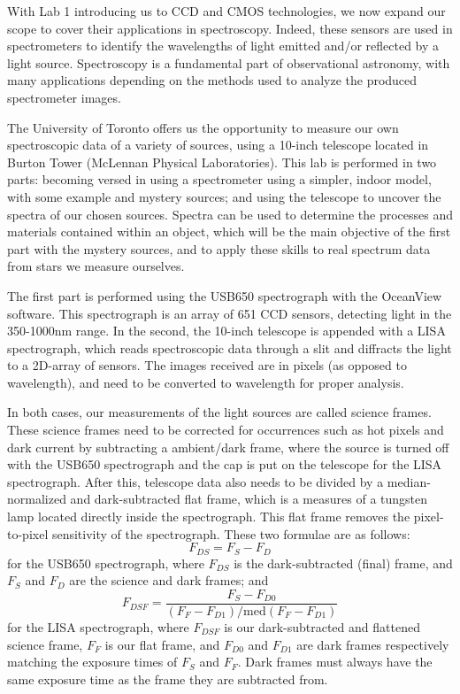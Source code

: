 \documentclass[twocolumn]{aastex702}
\begin{document}
		With Lab 1 introducing us to CCD and CMOS technologies, we now expand our scope to cover their applications in spectroscopy. Indeed, these sensors are used in spectrometers to identify the wavelengths of light emitted and/or reflected by a light source. 
		Spectroscopy is a fundamental part of observational astronomy, with many applications depending on the methods used to analyze the produced spectrometer images.
		
		The University of Toronto offers us the opportunity to measure our own spectroscopic data of a variety of sources, using a 10-inch telescope located in Burton Tower (McLennan Physical Laboratories). This lab is performed in two parts: becoming versed in using a spectrometer using a simpler, indoor model, with some example and mystery sources; and using the telescope to uncover the spectra of our chosen sources. Spectra can be used to determine the processes and materials contained within an object, which will be the main objective of the first part with the mystery sources, and to apply these skills to real spectrum data from stars we measure ourselves.
		
		The first part is performed using the USB650 spectrograph with the OceanView software. This spectrograph is an array of 651 CCD sensors, detecting light in the 350-1000nm range. In the second, the 10-inch telescope is appended with a LISA spectrograph, which reads spectroscopic data through a slit and diffracts the light to a 2D-array of sensors. The images received are in pixels (as opposed to wavelength), and need to be converted to wavelength for proper analysis.
		
		In both cases, our measurements of the light sources are called science frames. These science frames need to be corrected for occurrences such as hot pixels and dark current by subtracting a ambient/dark frame, where the source is turned off with the USB650 spectrograph and the cap is put on the telescope for the LISA spectrograph. After this, telescope data also needs to be divided by a median-normalized and dark-subtracted flat frame, which is a measures of a tungsten lamp located directly inside the spectrograph. This flat frame removes the pixel-to-pixel sensitivity of the spectrograph. These two formulae are as follows:
			\begin{equation}\label{eq:DS-USB650}
				F_{DS} = F_S - F_D
			\end{equation}
			for the USB650 spectrograph, where $F_{DS}$ is the dark-subtracted (final) frame, and $F_S$ and $F_D$ are the science and dark frames; and
			\begin{equation}
				F_{DSF} = \frac{F_S - F_{D0}}{(F_F - F_{D1}) / \text{med}(F_F - F_{D1})}
			\end{equation}
			for the LISA spectrograph, where $F_{DSF}$ is our dark-subtracted and flattened science frame, $F_F$ is our flat frame, and $F_{D0}$ and $F_{D1}$ are dark frames respectively matching the exposure times of $F_S$ and $F_F$. Dark frames must always have the same exposure time as the frame they are subtracted from.
			
\end{document}
